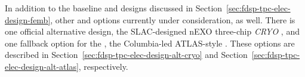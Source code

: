 In addition to the baseline  and  designs discussed in Section~\ref{sec:fdsp-tpc-elec-design-femb}, %
other  and  options currently under consideration, %
as well.  There is one official alternative design, the SLAC-designed nEXO three-chip \textit{CRYO} , and one fallback option for the  , the Columbia-led ATLAS-style  .  These options are described in Section~\ref{sec:fdsp-tpc-elec-design-alt-cryo} and Section~\ref{sec:fdsp-tpc-elec-design-alt-atlas}, respectively.
